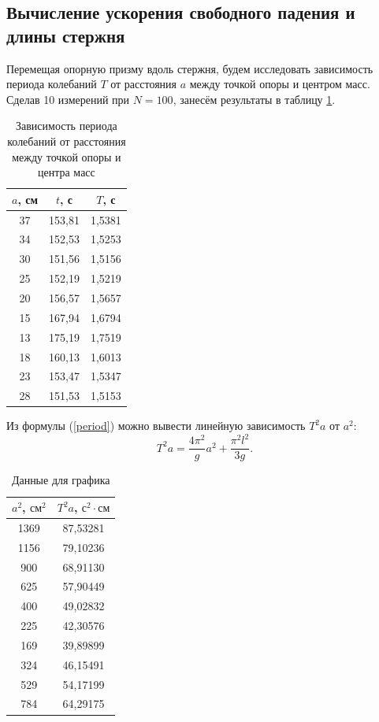 \documentclass{article}
\begin{document}
\subsection*{Вычисление ускорения свободного падения и длины стержня}
Перемещая опорную призму вдоль стержня, будем исследовать зависимость периода колебаний \(T\) от расстояния \(a\) между точкой опоры и центром масс. Сделав 10 измерений при \(N = 100\), занесём результаты в таблицу \ref{tab2}. 
\begin{table}[h!]
\centering
\begin{tabular}{|c|c|c|} \hline
\(a\), см & \(t\), с   & \(T\), с   \\ \hline
37    & 153,81 & 1,5381 \\
34    & 152,53 & 1,5253 \\
30    & 151,56 & 1,5156 \\
25    & 152,19 & 1,5219 \\
20    & 156,57 & 1,5657 \\
15    & 167,94 & 1,6794 \\
13    & 175,19 & 1,7519 \\
18    & 160,13 & 1,6013 \\
23    & 153,47 & 1,5347 \\
28    & 151,53 & 1,5153 \\
\hline
\end{tabular}
\caption{Зависимость периода колебаний от расстояния между точкой опоры и центра масс}
\label{tab2}
\end{table}
\noindent

Из формулы (\ref{period}) можно вывести линейную зависимость \(T^{2}a \text{ от } a^{2}\):
\begin{equation} \label{linear}
T^2a=\frac{4\pi^2}{g}a^2+\frac{\pi^2l^2}{3g}.
\end{equation}
\begin{table}[h!]
\centering
\begin{tabular}{|c|c|} \hline
\(a^2\), \(\text{см}^2\) & \(T^2a\), \(\text{с}^2\cdot\text{см}\) \\ \hline
1369      & 87,53281    \\
1156      & 79,10236     \\
900       & 68,91130     \\
625       & 57,90449     \\
400       & 49,02832      \\
225       & 42,30576      \\
169       & 39,89899     \\
324       & 46,15491     \\
529       & 54,17199     \\
784       & 64,29175     \\ 
\hline
\end{tabular}
\caption{Данные для графика}
\label{tab3}
\end{table}
\end{document}
